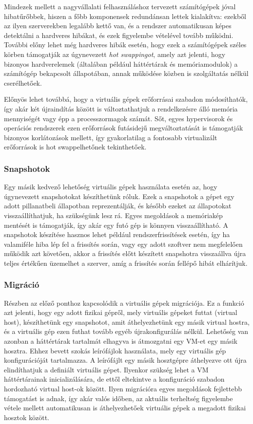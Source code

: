 Mindezek mellett a nagyvállalati felhasználáshoz tervezett számítógépek jóval hibatűrőbbek, hiszen a főbb komponensek redundánsan lettek kialakítva: ezekből az ilyen szerverekben legalább kettő van, és a rendszer automatikusan képes detektálni a hardveres hibákat, és ezek figyelembe vételével tovább működni. További előny lehet még hardveres hibák esetén, hogy ezek a számítógépek széles körben támogatják az úgynevezett \textit{hot swappingot}, amely azt jelenti, hogy bizonyos hardverelemek (általában például háttértárak és memóriamodulok) a számítógép bekapcsolt állapotában, annak működése közben is szolgáltatás nélkül cserélhetőek.

Előnyös lehet továbbá, hogy a virtuális gépek erőforrásai szabadon módosíthatók, így akár két újraindítás között is változtathatjuk a rendelkezésre álló memória mennyiségét vagy épp a processzormagok számát. Sőt, egyes hypervisorok és operációs rendszerek ezen erőforrások futásidejű megváltoztatását is támogatják bizonyos korlátozások mellett, így gyakorlatilag a fontosabb virtualizált erőforrások is hot swappelhetőnek tekinthetőek.

\subsubsection{Snapshotok}
Egy másik kedvező lehetőség virtuális gépek használata esetén az, hogy úgynevezett snapshotokat készíthetünk róluk. Ezek a snapshotok a gépet egy adott pillanatbeli állapotban reprezentálják, és később ezeket az állapotokat visszaállíthatjuk, ha szükségünk lesz rá. Egyes megoldások a memóriakép mentését is támogatják, így akár egy futó gép is könnyen visszaállítható. A snapshotok készítése hasznos lehet például rendszerfrissítések esetén, így ha valamiféle hiba lép fel a frissítés során, vagy egy adott szoftver nem megfelelően működik azt követően, akkor a frissítés előtt készített snapshotra visszaállva újra teljes értékűen üzemelhet a szerver, amíg a frissítés során fellépő hibát elhárítjuk.

\subsubsection{Migráció}
Részben az előző ponthoz kapcsolódik a virtuális gépek migrációja. Ez a funkció azt jelenti, hogy egy adott fizikai gépről, mely virtuális gépeket futtat (virtual host), készíthetünk egy snapshotot, amit áthelyezhetünk egy másik virtual hostra, és a virtuális gép ezen futhat tovább egyéb újrakonfigurálás nélkül.
Lehetőség van azonban a háttértárak tartalmát elhagyva is átmozgatni egy VM-et egy másik hosztra. Ehhez bevett szokás leírófájlok használata, mely egy virtuális gép konfigurációját tartalmazza. A leírófájlt egy másik hosztgépre áthelyezve ott újra elindíthatjuk a definiált virtuális gépet. Ilyenkor szükség lehet a VM háttértárainak inicializálására, de ettől eltekintve a konfiguráció szabadon hordozható virtual host-ok között. Ilyen migrációra egyes megoldások fejlettebb támogatást is adnak, így akár valós időben, az aktuális terheltség figyelembe vétele mellett automatikusan is áthelyezhetőek virtuális gépek a megadott fizikai hosztok között.

